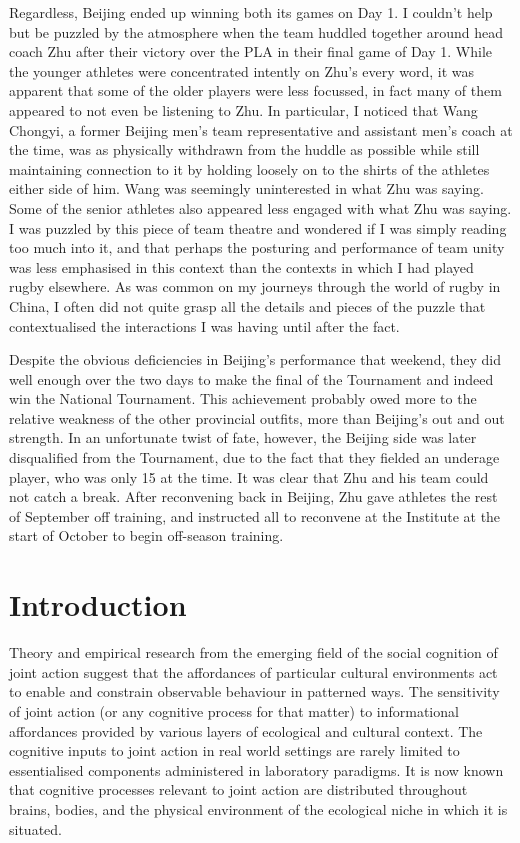   Regardless, Beijing ended up winning both its games on Day 1. I couldn't help but be puzzled by the atmosphere when the team huddled together around head coach Zhu after their victory over the PLA in their final game of Day 1.  While the younger athletes were concentrated intently on Zhu's every word, it was apparent that some of the older players were less focussed, in fact many of them appeared to not even be listening to Zhu.  In particular, I noticed that Wang Chongyi, a former Beijing men's team representative and assistant men's coach at the time, was as physically withdrawn from the huddle as possible while still maintaining connection to it by holding loosely on to the shirts of the athletes either side of him. Wang was seemingly uninterested in what Zhu was saying.  Some of the senior athletes also appeared less engaged with what Zhu was saying.  I was puzzled by this piece of team theatre and wondered if I was simply reading too much into it, and that perhaps the posturing and performance of team unity was less emphasised in this context than the contexts in which I had played rugby elsewhere. As was common on my journeys through the world of rugby in China, I often did not quite grasp all the details and pieces of the puzzle that contextualised the interactions I was having until after the fact.

  Despite the obvious deficiencies in Beijing's performance that weekend, they did well enough over the two days to make the final of the Tournament and indeed win the National Tournament.  This achievement probably owed more to the relative weakness of the other provincial outfits, more than Beijing's out and out strength.  In an unfortunate twist of fate, however, the Beijing side was later disqualified from the Tournament, due to the fact that they fielded an underage player, who was only 15 at the time.  It was clear that Zhu and his team could not catch a break.  After reconvening back in Beijing, Zhu gave athletes the rest of September off training, and instructed all to reconvene at the Institute at the start of October to begin off-season training.




  \section{Introduction}

  Theory and empirical research from the emerging field of the social cognition of joint action suggest that the affordances of particular cultural environments act to enable and constrain observable behaviour in patterned ways.  The sensitivity of joint action (or any cognitive process for that matter) to informational affordances provided by various layers of ecological and cultural context.  The cognitive inputs to joint action in real world settings are rarely limited to essentialised components administered in laboratory paradigms. It is now known that cognitive processes relevant to joint action are distributed throughout brains, bodies, and the physical environment of the ecological niche in which it is situated.

